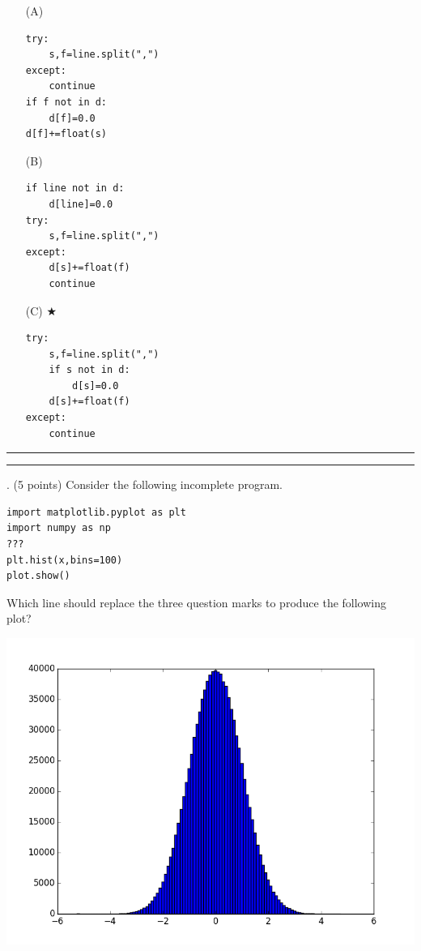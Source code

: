\documentclass{article}
\newcounter{question}
\begin{document}
\begin{enumerate}
\item[(A)]
\begin{verbatim}
try:
    s,f=line.split(",")
except:
    continue
if f not in d:
    d[f]=0.0
d[f]+=float(s)
\end{verbatim}

\item[(B)]
\begin{verbatim}
if line not in d:
    d[line]=0.0
try:
    s,f=line.split(",")
except:
    d[s]+=float(f)
    continue
\end{verbatim}

\item[(C)] $\bigstar$ 
\begin{verbatim}
try:
    s,f=line.split(",")
    if s not in d:
        d[s]=0.0
    d[s]+=float(f)
except:
    continue
\end{verbatim}

\end{enumerate}

\vspace*{2em}
\hrule
\vspace{2em}

\vspace{2em}
\hrule height 2pt


\newpage
{}. (5 points)
Consider the following incomplete program.

\begin{verbatim}
import matplotlib.pyplot as plt
import numpy as np
???
plt.hist(x,bins=100)
plot.show()
\end{verbatim}

Which line should replace the three question marks to produce the following plot?

\includegraphics[scale=.5]{./img/normal.png}
\end{document}
